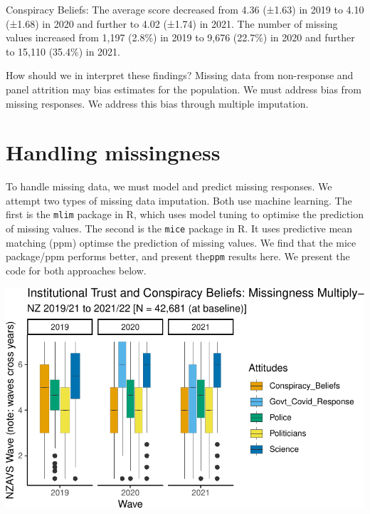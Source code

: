 \documentclass[
  singlecolumn]{report}
\begin{document}
Conspiracy Beliefs: The average score decreased from 4.36 (±1.63) in
2019 to 4.10 (±1.68) in 2020 and further to 4.02 (±1.74) in 2021. The
number of missing values increased from 1,197 (2.8\%) in 2019 to 9,676
(22.7\%) in 2020 and further to 15,110 (35.4\%) in 2021.

How should we in interpret these findings? Missing data from
non-response and panel attrition may bias estimates for the population.
We must address bias from missing responses. We address this bias
through multiple imputation.

\hypertarget{handling-missingness}{%
\section{Handling missingness}\label{handling-missingness}}

To handle missing data, we must model and predict missing responses. We
attempt two types of missing data imputation. Both use machine learning.
The first is the \texttt{mlim} package in R, which uses model tuning to
optimise the prediction of missing values. The second is the
\texttt{mice} package in R. It uses predictive mean matching (ppm)
optimse the prediction of missing values. We find that the mice
package/ppm performs better, and present the\texttt{ppm} results here.
We present the code for both approaches below.

\includegraphics{trust-science_files/figure-pdf/ppm-graph-1.pdf}
\end{document}
